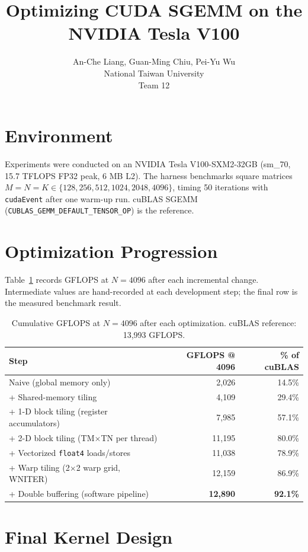 \documentclass{article}
\title{Optimizing CUDA SGEMM on the NVIDIA Tesla V100}
\author{%
  An-Che Liang, Guan-Ming Chiu, Pei-Yu Wu\\
  National Taiwan University\\
  Team 12\\
}
\begin{document}
\maketitle

\section{Environment}

Experiments were conducted on an NVIDIA Tesla V100-SXM2-32GB (sm\_70, 15.7 TFLOPS FP32 peak, 6 MB L2).
The harness benchmarks square matrices $M = N = K \in \{128, 256, 512, 1024, 2048, 4096\}$,
timing 50 iterations with \texttt{cudaEvent} after one warm-up run.
cuBLAS SGEMM (\texttt{CUBLAS\_GEMM\_DEFAULT\_TENSOR\_OP}) is the reference.

\section{Optimization Progression}

Table~\ref{tab:opt} records GFLOPS at $N = 4096$ after each incremental change.
Intermediate values are hand-recorded at each development step; the final row is the measured
benchmark result.

\begin{table}[H]
\centering
\begin{tabular}{lrr}
\toprule
Step & GFLOPS @ 4096 & \% of cuBLAS \\
\midrule
Naive (global memory only)                    &  2,026 & 14.5\% \\
+ Shared-memory tiling                        &  4,109 & 29.4\% \\
+ 1-D block tiling (register accumulators)    &  7,985 & 57.1\% \\
+ 2-D block tiling (TM$\times$TN per thread)  & 11,195 & 80.0\% \\
+ Vectorized \texttt{float4} loads/stores     & 11,038 & 78.9\% \\
+ Warp tiling (2$\times$2 warp grid, WNITER)  & 12,159 & 86.9\% \\
+ Double buffering (software pipeline)        & \textbf{12,890} & \textbf{92.1\%} \\
\bottomrule
\end{tabular}
\caption{Cumulative GFLOPS at $N=4096$ after each optimization.
         cuBLAS reference: 13,993 GFLOPS.}
\label{tab:opt}
\end{table}

\section{Final Kernel Design}
\end{document}
